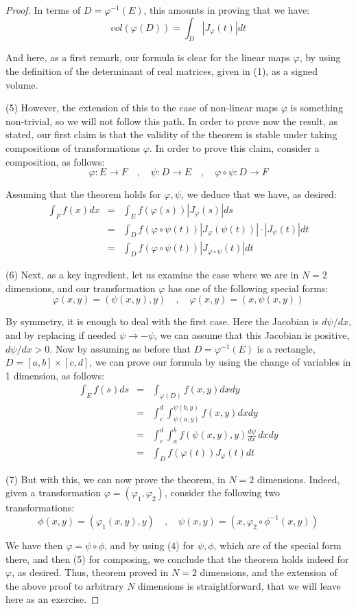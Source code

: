 \documentclass[12pt]{amsbook}
\begin{document}
\begin{proof}
In terms of $D={\varphi^{-1}(E)}$, this amounts in proving that we have:
$$vol(\varphi(D))=\int_D|J_\varphi(t)|dt$$

And here, as a first remark, our formula is clear for the linear maps $\varphi$, by using the definition of the determinant of real matrices, given in (1), as a signed volume.

\medskip

(5) However, the extension of this to the case of non-linear maps $\varphi$ is something non-trivial, so we will not follow this path. In order to prove now the result, as stated, our first claim is that the validity of the theorem is stable under taking compositions of transformations $\varphi$. In order to prove this claim, consider a composition, as follows:
$$\varphi:E\to F\quad,\quad 
\psi:D\to E\quad,\quad 
\varphi\circ\psi:D\to F$$

Assuming that the theorem holds for $\varphi,\psi$, we deduce that we have, as desired:
\begin{eqnarray*}
\int_Ff(x)dx
&=&\int_Ef(\varphi(s))|J_\varphi(s)|ds\\
&=&\int_Df(\varphi\circ\psi(t))|J_\varphi(\psi(t))|\cdot|J_\psi(t)|dt\\
&=&\int_Df(\varphi\circ\psi(t))|J_{\varphi\circ\psi}(t)|dt
\end{eqnarray*}

(6) Next, as a key ingredient, let us examine the case where we are in $N=2$ dimensions, and our transformation $\varphi$ has one of the following special forms:
$$\varphi(x,y)=(\psi(x,y),y)\quad,\quad\varphi(x,y)=(x,\psi(x,y))$$

By symmetry, it is enough to deal with the first case. Here the Jacobian is $d\psi/dx$, and by replacing if needed $\psi\to-\psi$, we can assume that this Jacobian is positive, $d\psi/dx>0$. Now by assuming as before that $D=\varphi^{-1}(E)$ is a rectangle, $D=[a,b]\times[c,d]$, we can prove our formula by using the change of variables in 1 dimension, as follows:
\begin{eqnarray*}
\int_Ef(s)ds
&=&\int_{\varphi(D)}f(x,y)dxdy\\
&=&\int_c^d\int_{\psi(a,y)}^{\psi(b,y)}f(x,y)dxdy\\
&=&\int_c^d\int_a^bf(\psi(x,y),y)\frac{d\psi}{dx}\,dxdy\\
&=&\int_Df(\varphi(t))J_\varphi(t)dt
\end{eqnarray*}

(7) But with this, we can now prove the theorem, in $N=2$ dimensions. Indeed, given a transformation $\varphi=(\varphi_1,\varphi_2)$, consider the following two transformations:
$$\phi(x,y)=(\varphi_1(x,y),y)\quad,\quad \psi(x,y)=(x,\varphi_2\circ\phi^{-1}(x,y))$$

We have then $\varphi=\psi\circ\phi$, and by using (4) for $\psi,\phi$, which are of the special form there, and then (5) for composing, we conclude that the theorem holds indeed for $\varphi$, as desired. Thus, theorem proved in $N=2$ dimensions, and the extension of the above proof to arbitrary $N$ dimensions is straightforward, that we will leave here as an exercise.
\end{proof}
\end{document}
